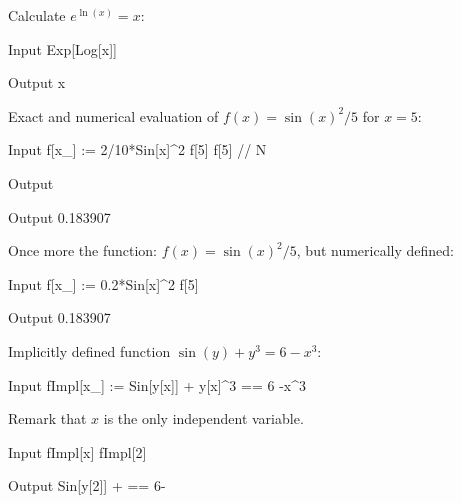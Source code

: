 \begin{example}
Calculate $e^{\ln(x)}=x$:

\begin{mdframed}[default,backgroundcolor=gray!40,roundcorner=8pt]
	\begin{mmaCell}[]{Input}
		Exp[Log[x]]
	\end{mmaCell}
	\begin{mmaCell}[]{Output}
		x
	\end{mmaCell}
\end{mdframed}

Exact and numerical evaluation of $f(x) = \sin(x)^2/5$ for $x = 5$:
\begin{mdframed}[default,backgroundcolor=gray!40,roundcorner=8pt]

	\begin{mmaCell}[functionlocal={x_,x}]{Input}
		f[x_] := 2/10*Sin[x]^2
		f[5]
		f[5] // N
	\end{mmaCell}
	\begin{mmaCell}[]{Output}
	\end{mmaCell}
	\begin{mmaCell}[]{Output}
		0.183907
	\end{mmaCell}
\end{mdframed}
Once more the function: $f(x) = \sin(x)^2/5$, but numerically defined:

	\begin{mdframed}[default,backgroundcolor=gray!40,roundcorner=8pt]	
	\begin{mmaCell}[functionlocal={x_,x}]{Input}
		f[x_] := 0.2*Sin[x]^2
		f[5]
	\end{mmaCell}
	\begin{mmaCell}[]{Output}
		0.183907
	\end{mmaCell}
\end{mdframed}

	Implicitly defined function $\sin(y) + y^3 = 6-x^3:$
\begin{mdframed}[default,backgroundcolor=gray!40,roundcorner=8pt]
	\begin{mmaCell}[functionlocal={x_,x}]{Input}
		fImpl[x_] := Sin[y[x]] + y[x]^3 == 6 -x^3
	\end{mmaCell}
	Remark that $x$ is the only independent variable.
	\begin{mmaCell}[functionlocal={x_,x}]{Input}
		fImpl[x] 
		fImpl[2]
	\end{mmaCell}
	\begin{mmaCell}[]{Output}
		Sin[y[2]] +  == 6-
		

\end{mmaCell}
\end{mdframed}
\end{example}

